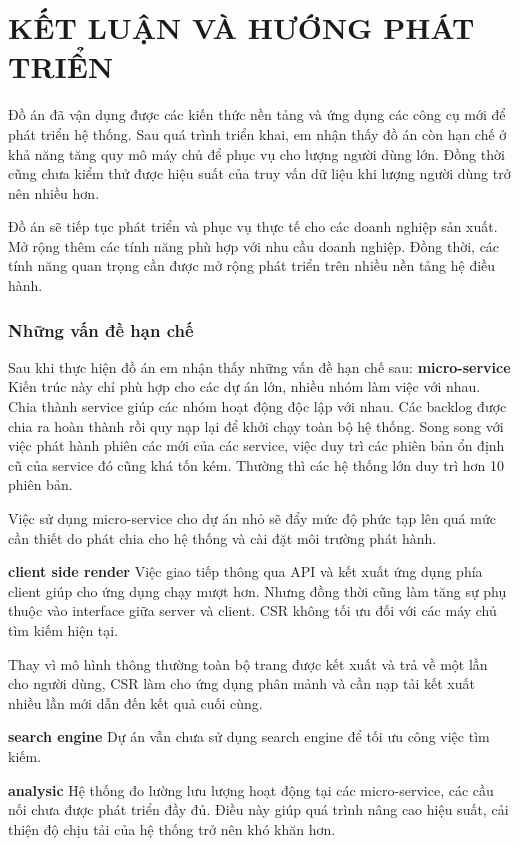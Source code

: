 \documentclass[11pt]{report}
\begin{document}
	\chapter*{KẾT LUẬN VÀ HƯỚNG PHÁT TRIỂN}
	Đồ án đã vận dụng được các kiến thức nền tảng và ứng dụng các công cụ mới để phát triển hệ thống. Sau quá trình triển khai, em nhận thấy đồ án còn hạn chế ở khả năng tăng quy mô máy chủ để phục vụ cho lượng người dùng lớn. Đồng thời cũng chưa kiểm thử được hiệu suất của truy vấn dữ liệu khi lượng người dùng trở nên nhiều hơn.
	
	Đồ án sẽ tiếp tục phát triển và phục vụ thực tế cho các doanh nghiệp sản xuất. Mở rộng thêm các tính năng phù hợp với nhu cầu doanh nghiệp. Đồng thời, các tính năng quan trọng cần được mở rộng phát triển trên nhiều nền tảng hệ điều hành.
	
		\subsection*{Những vấn đề hạn chế}
	Sau khi thực hiện đồ án em nhận thấy những vấn đề hạn chế sau:
	\textbf{micro-service} Kiến trúc này chỉ phù hợp cho các dự án lớn, nhiều nhóm làm việc với nhau. Chia thành service giúp các nhóm hoạt động độc lập với nhau. Các backlog được chia ra hoàn thành rồi quy nạp lại để khởi chạy toàn bộ hệ thống. Song song với việc phát hành phiên các mới của các service, việc duy trì các phiên bản ổn định cũ của service đó cũng khá tốn kém. Thường thì các hệ thống lớn duy trì hơn 10 phiên bản.
	
	Việc sử dụng micro-service cho dự án nhỏ sẽ đẩy mức độ phức tạp lên quá mức cần thiết do phát chia cho hệ thống và cài đặt môi trường phát hành.
	
	\textbf{client side render} Việc giao tiếp thông qua API và kết xuất ứng dụng phía client giúp cho ứng dụng chạy mượt hơn. Nhưng đồng thời cũng làm tăng sự phụ thuộc vào interface giữa server và client. CSR không tối ưu đối với các máy chủ tìm kiếm hiện tại.
	
	Thay vì mô hình thông thường toàn bộ trang được kết xuất và trả về một lần cho người dùng, CSR làm cho ứng dụng phân mảnh và cần nạp tải kết xuất nhiều lần mới dẫn đến kết quả cuối cùng.
	
	\textbf{search engine} Dự án vẫn chưa sử dụng search engine để tối ưu công việc tìm kiếm.
	
	\textbf{analysic} Hệ thống đo lường lưu lượng hoạt động tại các micro-service, các cầu nối chưa được phát triển đầy đủ. Điều này giúp quá trình nâng cao hiệu suất, cải thiện độ chịu tải của hệ thống trở nên khó khăn hơn.
	
\end{document}
